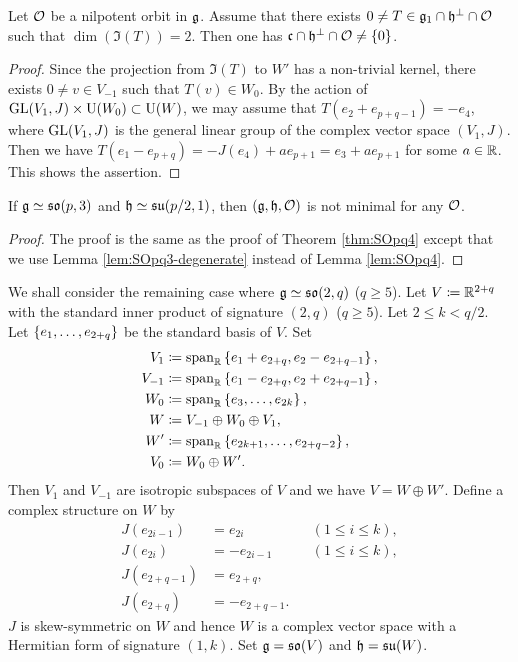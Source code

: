 \begin{lemma} \label{lem:SOpq3-degenerate}
	Let $\mathcal{O}$ be a nilpotent orbit in $\mathfrak{g}$.
	Assume that there exists $0 \neq T \in \mathfrak{g}_1 \cap \mathfrak{h}^\perp \cap \mathcal{O}$ such that $\dim(\Im(T)) = 2$.
	Then one has $\mathfrak{c} \cap \mathfrak{h}^\perp \cap \mathcal{O} \neq \left\{0 \right\}$.
\end{lemma}

\begin{proof}
	Since the projection from $\Im(T)$ to $W'$ has a non-trivial kernel, there exists $0\neq v \in V_{-1}$ such that $T(v) \in W_0$.
	By the action of $\mathrm{GL}(V_1, J)\times \mathrm{U}(W_0) \subset \mathrm{U}(W)$, we may assume that $T(e_2 + e_{p+q-1}) = -e_4$, where $\mathrm{GL}(V_1, J)$ is the general linear group of the complex vector space $(V_1, J)$.
	Then we have $T(e_1 - e_{p+q}) = -J(e_4) + ae_{p+1} = e_3 + ae_{p+1}$ for some $a \in \mathbb{R}$.
	This shows the assertion.
\end{proof}

\begin{theorem} \label{thm:SOpq3}
	If $\mathfrak{g} \simeq \mathfrak{so}(p, 3)$ and $\mathfrak{h} \simeq \mathfrak{su}(p/2, 1)$, then $(\mathfrak{g}, \mathfrak{h}, \mathcal{O})$ is not minimal for any $\mathcal{O}$.
\end{theorem}

\begin{proof}
	The proof is the same as the proof of Theorem \ref{thm:SOpq4} except that we use Lemma \ref{lem:SOpq3-degenerate} instead of Lemma \ref{lem:SOpq4}.
\end{proof}

We shall consider the remaining case where $\mathfrak{g} \simeq \mathfrak{so}(2, q)$ ($q \geq 5$).
Let $V \coloneq \mathbb{R}^{2+q}$ with the standard inner product of signature $(2, q)$ ($q \geq 5$).
Let $2\leq k < q/2$.
Let $\left\{e_1, \ldots, e_{2+q} \right\}$ be the standard basis of $V$.
Set
\begin{align*}
	V_1 &\coloneq \mathrm{span}_{\mathbb{R}}\left\{e_1 + e_{2+q}, e_2 - e_{2+q-1}\right\}, \\
	V_{-1} &\coloneq \mathrm{span}_{\mathbb{R}}\left\{e_1 - e_{2+q}, e_2 + e_{2+q-1}\right\}, \\
	W_0 &\coloneq \mathrm{span}_{\mathbb{R}}\left\{e_3, \ldots, e_{2k}\right\}, \\
	W &\coloneq V_{-1} \oplus W_0 \oplus V_{1}, \\
	W' &\coloneq \mathrm{span}_{\mathbb{R}}\left\{e_{2k+1}, \ldots, e_{2+q-2}\right\}, \\
	V_0 &\coloneq W_0 \oplus W'.
\end{align*}
Then $V_1$ and $V_{-1}$ are isotropic subspaces of $V$ and we have $V = W \oplus W'$.
Define a complex structure on $W$ by
\begin{align*}
	J(e_{2i-1}) &= e_{2i} &&(1\leq i \leq k), \\
	J(e_{2i}) &= -e_{2i-1} &&(1\leq i \leq k), \\
	J(e_{2+q-1}) &= e_{2+q}, \\
	J(e_{2+q}) &= -e_{2+q-1}.
\end{align*}
$J$ is skew-symmetric on $W$ and hence $W$ is a complex vector space with a Hermitian form of signature $(1, k)$.
Set $\mathfrak{g} = \mathfrak{so}(V)$ and $\mathfrak{h} = \mathfrak{su}(W)$.


